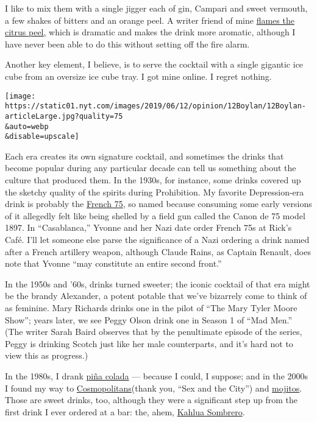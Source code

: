 I like to mix them with a single jigger each of gin, Campari and sweet
vermouth, a few shakes of bitters and an orange peel. A writer friend of
mine \href{https://www.youtube.com/watch?v=w-vJpeIwVwk}{flames the
citrus peel,} which is dramatic and makes the drink more aromatic,
although I have never been able to do this without setting off the fire
alarm.

Another key element, I believe, is to serve the cocktail with a single
gigantic ice cube from an oversize ice cube tray. I got mine online. I
regret nothing.

\texttt{[image: https://static01.nyt.com/images/2019/06/12/opinion/12Boylan/12Boylan-articleLarge.jpg?quality=75\\\&auto=webp\\\&disable=upscale]}

Each era creates its own signature cocktail, and sometimes the drinks
that become popular during any particular decade can tell us something
about the culture that produced them. In the 1930s, for instance, some
drinks covered up the sketchy quality of the spirits during Prohibition.
My favorite Depression-era drink is probably the
\href{https://food52.com/recipes/13206-voila-l-ete-the-french-75}{French
75}, so named because consuming some early versions of it allegedly felt
like being shelled by a field gun called the Canon de 75 model 1897. In
``Casablanca,'' Yvonne and her Nazi date order French 75s at Rick's
Café. I'll let someone else parse the significance of a Nazi ordering a
drink named after a French artillery weapon, although Claude Rains, as
Captain Renault, does note that Yvonne ``may constitute an entire second
front.''

In the 1950s and '60s, drinks turned sweeter; the iconic cocktail of
that era might be the brandy Alexander, a potent potable that we've
bizarrely come to think of as feminine. Mary Richards drinks one in the
pilot of ``The Mary Tyler Moore Show''; years later, we see Peggy Olson
drink one in Season 1 of ``Mad Men.'' (The writer Sarah Baird observes
that by the penultimate episode of the series, Peggy is drinking Scotch
just like her male counterparts, and it's hard not to view this as
progress.)

In the 1980s, I drank
\href{https://www.bonappetit.com/recipe/bas-best-pina-colada}{piña
colada} --- because I could, I suppose; and in the 2000s I found my way
to \href{http://www.drinksmixer.com/drink234.html}{Cosmopolitans}(thank
you, ``Sex and the City'') and
\href{https://www.foodnetwork.com/recipes/mojito-recipe0-1939252}{mojitos}.
Those are sweet drinks, too, although they were a significant step up
from the first drink I ever ordered at a bar: the, ahem,
\href{https://www.thespruceeats.com/sombrero-drink-recipe-759459}{Kahlua
Sombrero}.

